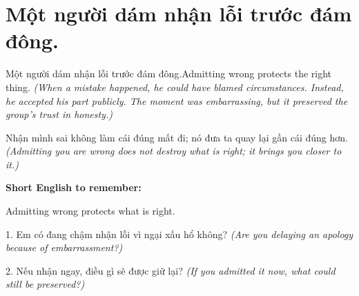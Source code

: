 \section{Một người dám nhận lỗi trước đám đông.}
\begin{truyen}{Một người dám nhận lỗi trước đám đông.}{Admitting wrong protects the right thing.}
\textit{(When a mistake happened, he could have blamed circumstances. Instead, he accepted his part publicly. The moment was embarrassing, but it preserved the group's trust in honesty.)}
\end{truyen}
\begin{baihoc}
Nhận mình sai không làm cái đúng mất đi; nó đưa ta quay lại gần cái đúng hơn.
\textit{(Admitting you are wrong does not destroy what is right; it brings you closer to it.)}
\end{baihoc}
\begin{ghinhoanh}\textbf{Short English to remember:}

Admitting wrong protects what is right.
\end{ghinhoanh}
\begin{tuhocnhanh}
1. Em có đang chậm nhận lỗi vì ngại xấu hổ không? \textit{(Are you delaying an apology because of embarrassment?)}

2. Nếu nhận ngay, điều gì sẽ được giữ lại? \textit{(If you admitted it now, what could still be preserved?)}
\end{tuhocnhanh}
\ngancach